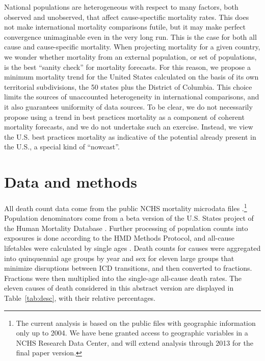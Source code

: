 \documentclass[11pt,oneside,a4paper]{article} %
\begin{document}
National populations are heterogeneous with respect to many factors, both
observed and unobserved, that affect cause-spectific mortality rates. This does
not make international mortality comparisons futile, but it may make perfect
convergence unimaginable even in the very long run. This is the case for both
all cause and cause-specific mortality. When projecting mortality for a given country, we wonder whether mortality from an external population, or set of populations, is the best ``sanity
check'' for mortality forecasts.
For this reason, we propose a minimum mortality trend for the United States
calculated on the basis of its own territorial subdivisions, the 50 states plus
the District of Columbia. This choice limits the sources of unaccounted
heterogeneity in international comparisons, and it also guarantees uniformity of
data sources.
To be clear, we do not necessarily propose using a trend in best practices mortality as a component of coherent mortality forecasts, and we do
not undertake such an exercise. Instead, we view the U.S. best practices
mortality as indicative of the potential already present in the U.S., a special
kind of ``nowcast''.

\section*{Data and methods}
All death count data come from the public NCHS mortality microdata files
\citep{NCHSdata}.\footnote{The current analysis is based on the public files
with geographic information only up to 2004. We have bene granted access to
geographic variables in a NCHS Research Data Center, and will extend analysis
through 2013 for the final paper version.} Population denominators come from a
beta version of the U.S.
States project of the Human Mortality Database \citep{HMD}. Further processing of
population counts into exposures is done according to the HMD Methods
Protocol, and all-cause lifetables were calculated by single ages \citep{HMDMP}.
Death counts for causes were aggregated into quinquennial age groups by year and sex for eleven large groups that minimize disruptions between ICD transitions, and then
converted to fractions. Fractions were then multiplied into the single-age
all-cause death rates. The eleven causes of death considered in this abstract
version are displayed in Table~\ref{tab:desc}, with their relative percentages.
\end{document}
